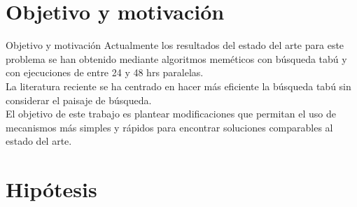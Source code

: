 \documentclass[11pt]{beamer}
\begin{document}
%
%
\section*{Objetivo y motivación}
\begin{frame}{Objetivo y motivación}
Actualmente los resultados del estado del arte para este problema se han obtenido mediante algoritmos meméticos con búsqueda tabú y con ejecuciones de entre 24 y 48 hrs paralelas.\\
La literatura reciente se ha centrado en hacer más eficiente la búsqueda tabú sin considerar el paisaje de búsqueda.\\
El objetivo de este trabajo es plantear modificaciones que permitan el uso de mecanismos más simples y rápidos para encontrar soluciones comparables al estado del arte.
\end{frame}
\section*{Hipótesis}
\end{document}
